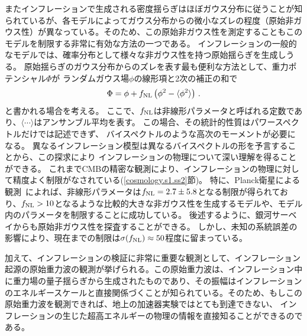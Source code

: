またインフレーションで生成される密度揺らぎはほぼガウス分布に従うことが知られているが、各モデルによってガウス分布からの微小なズレの程度（原始非ガウス性）が異なっている。そのため、この原始非ガウス性を測定することもこのモデルを制限する非常に有効な方法の一つである。
インフレーションの一般的なモデルでは、確率分布として様々な非ガウス性を持つ原始揺らぎを生成しうる。
原始揺らぎのガウス分布からのズレを表す最も便利な方法として、重力ポテンシャル$\Phi$が
ランダムガウス場$\phi$の線形項と2次の補正の和で
\begin{align}
	\Phi =\phi +f_{\rm NL}\left(\phi^2 -\langle\phi^2\rangle\right)
	\,.\label{eq:fNL def}
\end{align}
と書かれる場合を考える。
ここで、$f_{\rm NL}$は非線形パラメータと呼ばれる定数であり、$\langle\cdots\rangle$はアンサンブル平均を表す。
この場合、その統計的性質はパワースペクトルだけでは記述できず、
バイスペクトルのような高次のモーメントが必要になる。
異なるインフレーション模型は異なるバイスペクトルの形を予言することから、この探求により
インフレーションの物理について深い理解を得ることができる。
これまでCMBの精密な観測により、インフレーションの物理に対して精度よく制限がなされている(\ref{cosmology.s1.ss2}節)。
特に、Planck衛星による観測~\citep{Ade:2013ydc}によれば、非線形パラメータは$f_{\rm NL}=2.7\pm 5.8$となる制限が得られており、$f_{\rm NL}>10$となるような比較的大きな非ガウス性を生成するモデルや、モデル内のパラメータを制限することに成功している。
後述するように、銀河サーベイからも原始非ガウス性を探査することができる。
しかし、未知の系統誤差の影響により、現在までの制限は$\sigma (f_{\rm NL})\approx 50$程度に留まっている\citep{Ho:2013lda,Giannantonio:2013uqa}。

加えて、インフレーションの検証に非常に重要な観測として、インフレーション起源の原始重力波の観測が挙げられる。この原始重力波は、インフレーション中に重力場の量子揺らぎから生成されたものであり、その振幅はインフレーションのエネルギースケールと直接関係づくことが知られている。そのため、もしこの原始重力波を観測できれば、地上の加速器実験ではとても到達できない、
インフレーションの生じた超高エネルギーの物理の情報を直接知ることができるのである。



